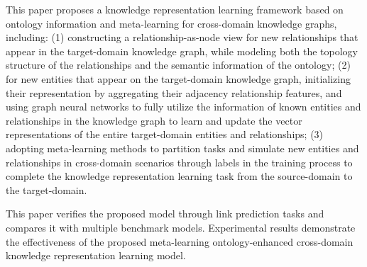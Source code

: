 This paper proposes a knowledge representation learning framework based on ontology information and meta-learning for cross-domain knowledge graphs, including: (1) constructing a relationship-as-node view for new relationships that appear in the target-domain knowledge graph, while modeling both the topology structure of the relationships and the semantic information of the ontology; (2) for new entities that appear on the target-domain knowledge graph, initializing their representation by aggregating their adjacency relationship features, and using graph neural networks to fully utilize the information of known entities and relationships in the knowledge graph to learn and update the vector representations of the entire target-domain entities and relationships; (3) adopting meta-learning methods to partition tasks and simulate new entities and relationships in cross-domain scenarios through labels in the training process to complete the knowledge representation learning task from the source-domain to the target-domain.

This paper verifies the proposed model through link prediction tasks and compares it with multiple benchmark models. Experimental results demonstrate the effectiveness of the proposed meta-learning ontology-enhanced cross-domain knowledge representation learning model.